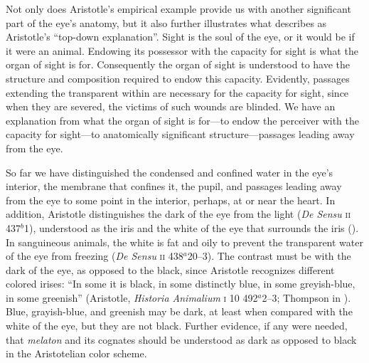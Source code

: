 Not only does Aristotle's empirical example provide us with another significant part of the eye's anatomy, but it also further illustrates what \citet{Johansen:1997zr} describes as Aristotle's ``top-down explanation''. Sight is the soul of the eye, or it would be if it were an animal. Endowing its possessor with the capacity for sight is what the organ of sight is for. Consequently the organ of sight is understood to have the structure and composition required to endow this capacity. Evidently, passages extending the transparent within are necessary for the capacity for sight, since when they are severed, the victims of such wounds are blinded. We have an explanation from what the organ of sight is for---to endow the perceiver with the capacity for sight---to anatomically significant structure---passages leading away from the eye.

So far we have distinguished the condensed and confined water in the eye's interior, the membrane that confines it, the pupil, and passages leading away from the eye to some point in the interior, perhaps, at or near the heart. In addition, Aristotle distinguishes the dark of the eye from the light (\emph{De Sensu} \textsc{ii} 437\( ^{b} \)1), understood as the iris and the white of the eye that surrounds the iris (\citealt[see][218, 231 n13]{Lloyd:1978fk}). In sanguineous animals, the white is fat and oily to prevent the transparent water of the eye from freezing (\emph{De Sensu} \textsc{ii} 438\( ^{a} \)20--3). The contrast must be with the dark of the eye, as opposed to the black, since Aristotle recognizes different colored irises: ``In some it is black, in some distinctly blue, in some greyish-blue, in some greenish'' (Aristotle, \emph{Historia Animalium} \textsc{i} 10 492\( ^{a} \)2--3; Thompson in \citealt[13]{Barnes:1984uq}). Blue, grayish-blue, and greenish may be dark, at least when compared with the white of the eye, but they are not black. Further evidence, if any were needed, that \emph{melaton} and its cognates should be understood as dark as opposed to black in the Aristotelian color scheme.

